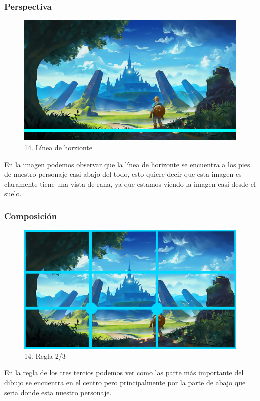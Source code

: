\documentclass[12pt]{article}
\begin{document}
    \subsubsection{Perspectiva}
    \begin{figure}[H]
      \centering
      \includegraphics[scale=0.35]{images/Selena/14_concept_art linia.jpg}
      \caption{\small 14. Línea de horzionte}
    \end{figure}
    En la imagen podemos observar que la línea de horizonte se encuentra a los pies de nuestro personaje casi abajo del todo, esto quiere decir que esta imagen es claramente tiene una vista de rana, ya que estamos viendo la imagen casi desde el suelo.

    
    \subsubsection{Composición}

    \begin{figure}[H]
      \centering
      \includegraphics[scale=0.35]{images/Selena/14 3.3.jpg}
      \caption{\small 14. Regla 2/3}
    \end{figure}
    En la regla de los tres tercios podemos ver como las parte más importante del dibujo se encuentra en el centro pero principalmente por la parte de abajo que seria donde esta nuestro personaje. 
\end{document}
